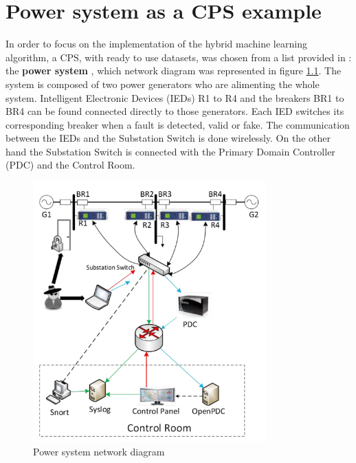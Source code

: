 \chapter{Power system as a CPS example}
In order to focus on the implementation of the hybrid machine learning algorithm, a CPS, with ready to use datasets, was chosen from a list provided in \cite{morris_industrial_nodate}: the \textbf{power system} \cite{adhikari_power_2014}, which network diagram was represented in figure \ref{fig:cps_rep}. The system is composed of two power generators who are alimenting the whole system. Intelligent Electronic Devices (IEDs) R1 to R4 and the breakers BR1 to BR4 can be found connected directly to those generators. Each IED switches its corresponding breaker when a fault is detected, valid or fake. The communication between the IEDs and the Substation Switch is done wirelessly. On the other hand the Substation Switch is connected with the Primary Domain Controller (PDC) and the Control Room.

\begin{figure}[H]
    \centering
    \includegraphics[width=90mm]{images/cps_rep.png}
    \caption[Power system network diagram]{Power system network diagram \cite{adhikari_power_2014}}
    \label{fig:cps_rep}
\end{figure}

